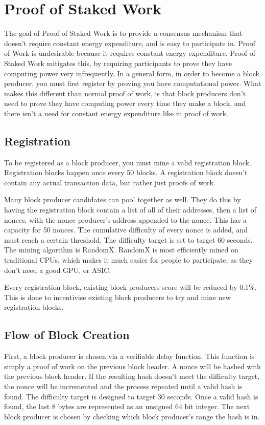 \documentclass[12pt, letterpaper]{article}
\begin{document}
\section{Proof of Staked Work}
The goal of Proof of Staked Work is to provide a consensus mechanism that
doesn't require constant energy expenditure, and is easy to participate in.
Proof of Work is undesirable because it requires constant energy expenditure.
Proof of Staked Work mitigates this, by requiring participants to prove they
have computing power very infrequently. In a general form, in order to become a
block producer, you must first register by proving you have computational power.
What makes this different than normal proof of work, is that block producers
don't need to prove they have computing power every time they make a block, and
there isn't a need for constant energy expenditure like in proof of work.

\subsection{Registration}
To be registered as a block producer, you must mine a valid registration block.
Registration blocks happen once every 50 blocks. A registration block doesn't
contain any actual transaction data, but rather just proofs of work.

Many block producer candidates can pool together as well. They do this by having
the registration block contain a list of all of their addresses, then a list of
nonces, with the nonce producer's address appended to the nonce. This has a
capacity for 50 nonces. The cumulative difficulty of every nonce is added, and
must reach a certain threshold. The difficulty target is set to target 60 
seconds. The mining algorithm is RandomX. RandomX is most efficiently mined on
traditional CPUs, which makes it much easier for people to participate, as they
don't need a good GPU, or ASIC.

Every registration block, existing block producers score will be reduced by
0.1\%. This is done to incentivise existing block producers to try and mine new
registration blocks.

\subsection{Flow of Block Creation}
First, a block producer is chosen via a verifiable delay function. This function
is simply a proof of work on the previous block header. A nonce will be hashed
with the previous block header. If the resulting hash doesn't meet the
difficulty target, the nonce will be incremented and the process repeated until
a valid hash is found. The difficulty target is designed to target 30 seconds.
Once a valid hash is found, the last 8 bytes are represented as an unsigned 64
bit integer. The next block producer is chosen by checking which block
producer's range the hash is in.
\end{document}
